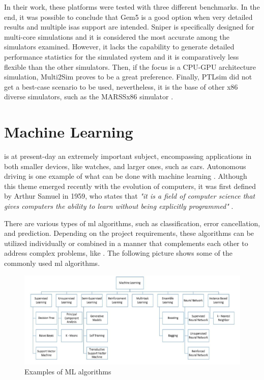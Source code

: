In their work, these platforms were tested with three different benchmarks. In the end, it was possible to conclude that Gem5 is a good option 
when very detailed results and multiple \glspl{isa} support are intended. Sniper is specifically designed for multi-core simulations and it is 
considered the most accurate among the simulators examined. However, it lacks the capability to generate detailed performance statistics for 
the simulated system and it is comparatively less flexible than the other simulators. Then, if the focus is a CPU-GPU architecture simulation, 
Multi2Sim proves to be a great preference. Finally, PTLsim did not get a best-case scenario to be used, nevertheless, it is the base of other 
x86 diverse simulators, such as the MARSSx86 simulator \cite{patel2011marss}.

\section{Machine Learning}

 is at present-day an extremely important subject, encompassing applications in both smaller devices, like watches, and larger 
ones, such as cars.  Autonomous driving is one example of what can be done with machine learning \cite{bachute2021autonomous}. Although this 
theme emerged recently with the evolution of computers, it was first defined by Arthur Samuel in 1959, who states that 
\textit{ "it is a field of computer science that gives computers the ability to learn without being explicitly programmed" }\cite{samuel1959some}. 

There are various types of \gls{ml} algorithms, such as classification, error cancellation, and prediction. Depending on the project 
requirements, these algorithms can be utilized individually or combined in a manner that complements each other to address complex problems, 
like \cite{bachute2021autonomous}. The following picture shows some of the commonly used \gls{ml} algorithms.

\begin{figure}[H]
	\centering
 	\includegraphics[width=0.9\linewidth]{Images/TypesOfML.png}
 	\caption{Examples of ML algorithms \cite{mahesh2020machine}}
	 \label{fig_TypesOfML}
\end{figure}

